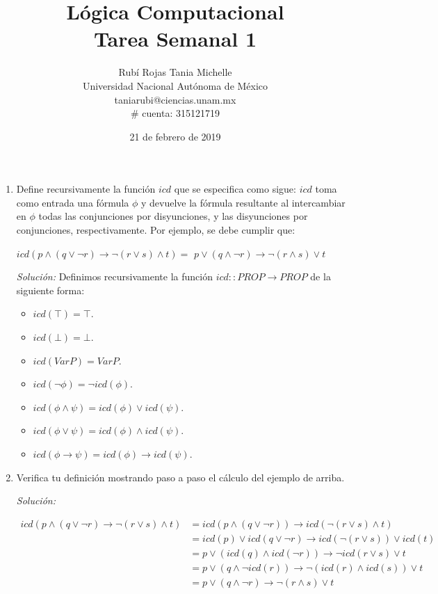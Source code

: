 \documentclass[letterpaper,11pt]{article}
\title{Lógica Computacional \\ Tarea Semanal 1}
\author{Rubí Rojas Tania Michelle \\
        Universidad Nacional Autónoma de México \\
        taniarubi@ciencias.unam.mx \\
        \# cuenta: 315121719}
\date{21 de febrero de 2019}
\begin{document}
\maketitle

\begin{enumerate}
    \item Define recursivamente la función $icd$ que se especifica como sigue:
    $icd$ toma como entrada una fórmula $\phi$ y devuelve la fórmula resultante
    al intercambiar en $\phi$ todas las conjunciones por disyunciones, y las 
    disyunciones por conjunciones, respectivamente. Por ejemplo, se debe 
    cumplir que:
    
    \begin{center}
        $icd (p \land (q \lor \neg r) \rightarrow \neg (r \lor s) \land t) = $
        $p \lor (q \land \neg r) \rightarrow \neg (r \land s) \lor t$
    \end{center}

    \textit{Solución:} Definimos recursivamente la función 
    $icd :: PROP \rightarrow PROP$ de la siguiente forma:
    
    \begin{itemize}
        \item $icd (\top) = \top$.
        \item $icd (\bot) = \bot$.
        \item $icd (Var P) = Var P$. 
        \item $icd (\neg \phi) = \neg icd(\phi)$. 
        \item $icd (\phi \land \psi) = icd(\phi) \lor icd(\psi)$. 
        \item $icd (\phi \lor \psi) = icd(\phi) \land icd(\psi)$. 
        \item $icd (\phi \rightarrow \psi) = icd(\phi) \rightarrow icd(\psi)$. 
    \end{itemize}

    \item Verifica tu definición mostrando paso a paso el cálculo del ejemplo 
    de arriba.

    \textit{Solución: }
    
    \begin{align*}
        icd(p \land (q \lor \neg r) \rightarrow \neg (r \lor s) \land t)
        &= icd(p \land (q\lor\neg r)) \rightarrow icd(\neg (r\lor s) \land t)\\
        &= icd(p) \lor icd(q\lor\neg r) \rightarrow icd( \neg(r\lor s)) \lor icd(t)\\
        &= p \lor (icd(q) \land icd(\neg r)) \rightarrow \neg icd(r \lor s) \lor t\\
        &= p \lor (q \land \neg icd(r)) \rightarrow \neg (icd(r) \land icd(s)) \lor t\\
        &= p \lor (q  \land \neg r) \rightarrow \neg (r \land s) \lor t
    \end{align*}


\end{enumerate}
\end{document}
